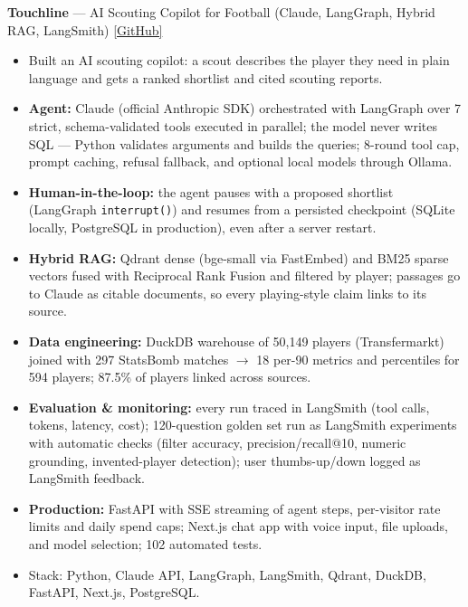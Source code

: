 \documentclass[11pt,a4paper]{article}
\begin{document}
\textbf{Touchline} --- AI Scouting Copilot for Football (Claude, LangGraph, Hybrid RAG, LangSmith) \hfill \href{https://github.com/davronbek-malikov/touchline}{[GitHub]}
\begin{itemize}
    \item Built an AI scouting copilot: a scout describes the player they need in plain language and gets a ranked
shortlist and cited scouting reports.
    \item \textbf{Agent:} Claude (official Anthropic SDK) orchestrated with LangGraph over 7 strict, schema-validated tools
executed in parallel; the model never writes SQL --- Python validates arguments and builds the queries; 8-round tool
cap, prompt caching, refusal fallback, and optional local models through Ollama.
    \item \textbf{Human-in-the-loop:} the agent pauses with a proposed shortlist (LangGraph \texttt{interrupt()}) and
resumes from a persisted checkpoint (SQLite locally, PostgreSQL in production), even after a server restart.
    \item \textbf{Hybrid RAG:} Qdrant dense (bge-small via FastEmbed) and BM25 sparse vectors fused with Reciprocal Rank
Fusion and filtered by player; passages go to Claude as citable documents, so every playing-style claim links to its
source.
    \item \textbf{Data engineering:} DuckDB warehouse of 50,149 players (Transfermarkt) joined with 297 StatsBomb matches
$\rightarrow$ 18 per-90 metrics and percentiles for 594 players; 87.5\% of players linked across sources.
    \item \textbf{Evaluation \& monitoring:} every run traced in LangSmith (tool calls, tokens, latency, cost); 120-question
golden set run as LangSmith experiments with automatic checks (filter accuracy, precision/recall@10, numeric
grounding, invented-player detection); user thumbs-up/down logged as LangSmith feedback.
    \item \textbf{Production:} FastAPI with SSE streaming of agent steps, per-visitor rate limits and daily spend caps;
Next.js chat app with voice input, file uploads, and model selection; 102 automated tests.
    \item Stack: Python, Claude API, LangGraph, LangSmith, Qdrant, DuckDB, FastAPI, Next.js, PostgreSQL.
\end{itemize}

\medskip
\end{document}
